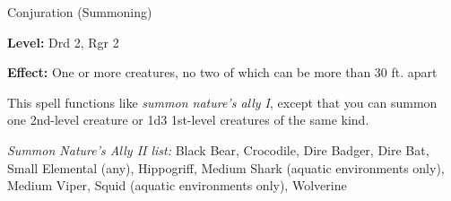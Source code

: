 
Conjuration (Summoning)

\textbf{Level:} Drd 2, Rgr 2

\textbf{Effect:} One or more creatures, no two of which can be more than 30 ft. 
apart

This spell functions like \textit{summon nature's ally I}, except that you can 
summon one 2nd-level creature or 1d3 1st-level creatures of the same kind.

\textit{Summon Nature's Ally II list:} Black Bear, Crocodile, Dire Badger, Dire Bat, Small Elemental (any), Hippogriff, Medium Shark (aquatic environments only), Medium Viper, Squid (aquatic environments only), Wolverine
